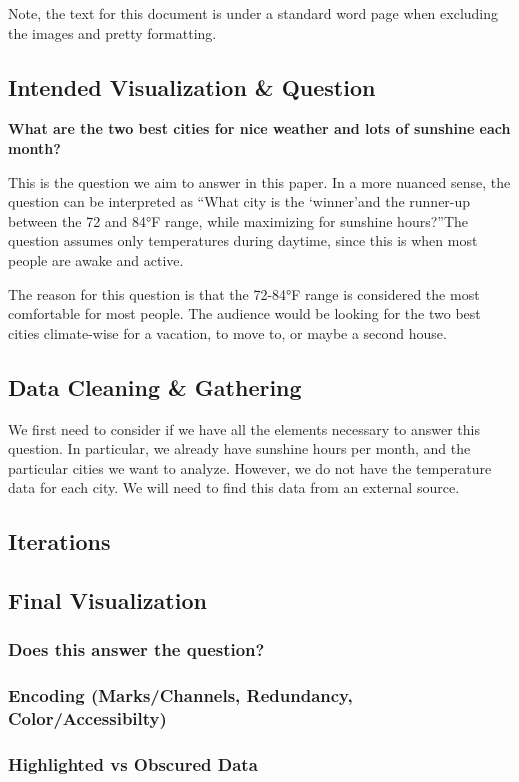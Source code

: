 \documentclass{article}
\begin{document}
\newpage
Note, the text for this document is under a standard word page when excluding the images and pretty formatting. 

\subsection{Intended Visualization \& Question}

\textbf{What are the two best cities for nice weather and lots of sunshine each month?}

This is the question we aim to answer in this paper. In a more nuanced sense,
the question can be interpreted as \textquotedblleft What city is the \textquoteleft winner\textquoteright and the runner-up between the 72 and 84°F
range, while maximizing for sunshine hours?\textquotedblright The question assumes only temperatures during daytime, since this 
is when most people are awake and active.

The reason for this question is that the 72-84°F range is considered the most comfortable for most people. 
The audience would be looking for the two best cities climate-wise for a vacation, to move to, or maybe a second house.

\subsection{Data Cleaning \& Gathering}

We first need to consider if we have all the elements necessary to answer this question.
In particular, we already have sunshine hours per month, and the particular cities we want to analyze.
However, we do not have the temperature data for each city. We will need to find this data from an external source.



\subsection{Iterations}

\subsection{Final Visualization}
\subsubsection{Does this answer the question?}
\subsubsection{Encoding (Marks/Channels, Redundancy, Color/Accessibilty)}
\subsubsection{Highlighted vs Obscured Data}



\end{document}
